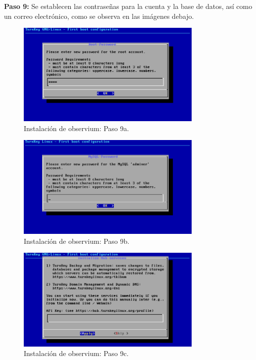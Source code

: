 \pagebreak
\noindent
\textbf{Paso 9:} Se establecen las contraseñas para la cuenta y la base de datos, así como un correo electrónico, como se observa en las imágenes debajo. 

\begin{figure}[htbp!]
	\centering
		\includegraphics[width=0.8\textwidth]{images/desarrollo/instalarObservium_paso9a.png}
	\caption{Instalación de observium: Paso 9a.}
\end{figure}

\begin{figure}[htbp!]
	\centering
		\includegraphics[width=0.8\textwidth]{images/desarrollo/instalarObservium_paso9b.png}
	\caption{Instalación de observium: Paso 9b.}
\end{figure}

\begin{figure}[htbp!]
	\centering
		\includegraphics[width=0.8\textwidth]{images/desarrollo/instalarObservium_paso9c.png}
	\caption{Instalación de observium: Paso 9c.}
\end{figure}

